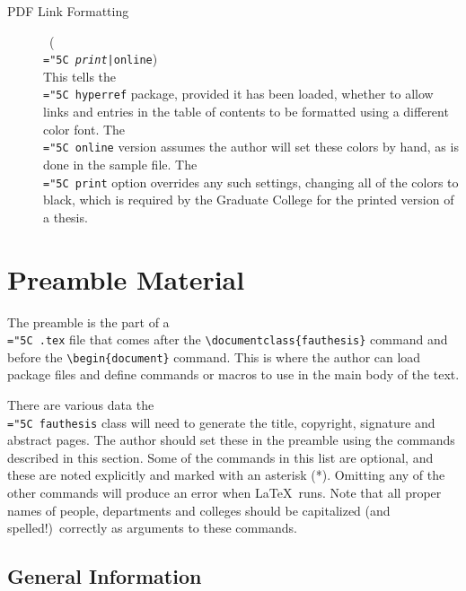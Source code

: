 \documentclass[11pt]{article}
\newcommand\code[1]{{\normalfont\texttt{\let\dv\textsl\chardef\\="5C #1}}}
\begin{document}
\begin{description}
\item[PDF Link Formatting] \dotfill\ (\code{\dv{print}|online})\\
This tells the \code{hyperref} package, provided it has been loaded, whether to allow links and entries in the table of contents to be formatted using a different color font.  The \code{online} version assumes the author will set these colors by hand, as is done in the sample file.  The \code{print} option overrides any such settings, changing all of the colors to black, which is required by the Graduate College for the printed version of a thesis.
\end{description}



\section{Preamble Material}\label{preamble}

The preamble is the part of a \code{.tex} file that comes after the \verb=\documentclass{fauthesis}= command and before the \verb=\begin{document}= command.  This is where the author can load package files and define commands or macros to use in the main body of the text.

There are various data the \code{fauthesis} class will need to generate the title, copyright, signature and abstract pages.  The author should set these in the preamble using the commands described in this section.  Some of the commands in this list are optional, and these are noted explicitly and marked with an asterisk (*).  Omitting any of the other commands will produce an error when \LaTeX\ runs.  Note that all proper names of people, departments and colleges should be capitalized (and spelled!)\ correctly as arguments to these commands.



\subsection{General Information}\label{general}
\end{document}
